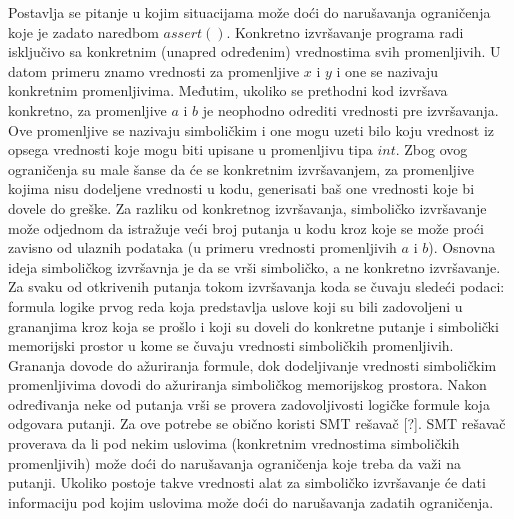 \documentclass[12pt]{article}
\begin{document}
Postavlja se pitanje u kojim situacijama može doći do narušavanja ograničenja koje je zadato naredbom $assert()$. 
Konkretno izvršavanje programa radi isključivo sa konkretnim (unapred određenim) vrednostima svih promenljivih. U datom primeru znamo vrednosti za promenljive $x$ i $y$ i one se nazivaju konkretnim promenljivima. Međutim, ukoliko se prethodni kod izvršava konkretno, za promenljive $a$ i $b$ je neophodno odrediti vrednosti pre izvršavanja. Ove promenljive se nazivaju simboličkim i one mogu uzeti bilo koju vrednost iz opsega vrednosti koje mogu biti upisane u promenljivu tipa $int$. Zbog ovog ograničenja su male šanse da će se konkretnim izvršavanjem, za promenljive kojima nisu dodeljene vrednosti u kodu, generisati baš one vrednosti koje bi dovele do greške. Za razliku od konkretnog izvršavanja, simboličko izvršavanje može odjednom da istražuje veći broj putanja u kodu kroz koje se može proći zavisno od ulaznih podataka (u primeru vrednosti promenljivih $a$ i $b$). Osnovna ideja simboličkog izvršavnja je da se vrši simboličko, a ne konkretno izvršavanje. Za svaku od otkrivenih putanja tokom izvršavanja koda se čuvaju sledeći podaci: formula logike prvog reda koja predstavlja uslove koji su bili zadovoljeni u grananjima kroz koja se prošlo i koji su doveli do konkretne putanje i simbolički memorijski prostor u kome se čuvaju vrednosti simboličkih promenljivih. Grananja dovode do ažuriranja formule, dok dodeljivanje vrednosti simboličkim promenljivima dovodi do ažuriranja simboličkog memorijskog prostora. Nakon određivanja neke od putanja vrši se provera zadovoljivosti logičke formule koja odgovara putanji. Za ove potrebe se obično koristi SMT rešavač [?]. SMT rešavač proverava da li pod nekim uslovima (konkretnim vrednostima simboličkih promenljivih) može doći do narušavanja ograničenja koje treba da važi na putanji. Ukoliko postoje takve vrednosti alat za simboličko izvršavanje će dati informaciju pod kojim uslovima može doći do narušavanja zadatih ograničenja.
\end{document}

